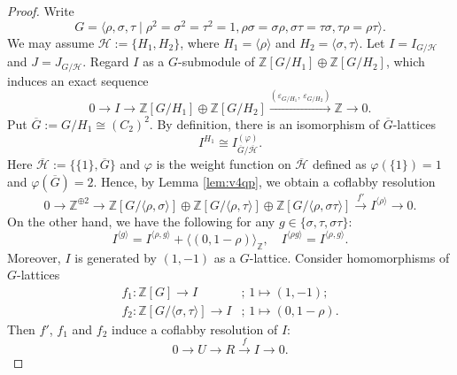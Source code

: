 \documentclass[12pt]{amsart}
\theoremstyle{plain}
\theoremstyle{definition}
\numberwithin{thm}{section}
\numberwithin{equation}{section}
\newcommand{\Z}{\mathbb{Z}}
\newcommand{\cH}{\mathcal{H}}
\begin{document}
\begin{proof}
Write
\begin{equation*}
  G=\langle \rho,\sigma,\tau \mid \rho^{2}=\sigma^{2}=\tau^{2}=1,\rho \sigma=\sigma\rho,\sigma \tau=\tau\sigma, \tau \rho=\rho\tau \rangle.  
\end{equation*}
We may assume $\cH:=\{H_{1},H_{2}\}$, where $H_{1}=\langle \rho \rangle$ and $H_{2}=\langle \sigma,\tau \rangle$. Let $I=I_{G/\cH}$ and $J=J_{G/\cH}$. Regard $I$ as a $G$-submodule of $\Z[G/H_{1}]\oplus \Z[G/H_{2}]$, which induces an exact sequence
\begin{equation}\label{eq:2mvr}
    0\rightarrow I \rightarrow \Z[G/H_{1}]\oplus \Z[G/H_{2}] \xrightarrow{(\varepsilon_{G/H_{1}},\,\varepsilon_{G/H_{2}})} \Z \rightarrow 0. 
\end{equation}
Put $\overline{G}:=G/H_{1} \cong (C_{2})^{2}$. By definition, there is an isomorphism of $\overline{G}$-lattices
\begin{equation*}
    I^{H_{1}}\cong I_{\overline{G}/\overline{\cH}}^{(\varphi)}.
\end{equation*}
Here $\overline{\cH}:=\{\{1\},\overline{G}\}$ and $\varphi$ is the weight function on $\overline{\cH}$ defined as $\varphi(\{1\})=1$ and $\varphi(\overline{G})=2$. Hence, by Lemma \ref{lem:v4qp}, we obtain a coflabby resolution
\begin{equation*}
    0\rightarrow \Z^{\oplus 2}\rightarrow \Z[G/\langle \rho, \sigma \rangle]\oplus \Z[G/\langle \rho,\tau \rangle]\oplus \Z[G/\langle \rho,\sigma \tau \rangle] \xrightarrow{f'} I^{\langle \rho \rangle}\rightarrow 0. 
\end{equation*}
On the other hand, we have the following for any $g\in \{\sigma,\tau,\sigma\tau \}$: 
\begin{equation*}
    I^{\langle g\rangle}=I^{\langle \rho,g\rangle}+\langle (0,1-\rho) \rangle_{\Z},\quad
    I^{\langle \rho g\rangle}=I^{\langle \rho,g\rangle}. 
\end{equation*}
Moreover, $I$ is generated by $(1,-1)$ as a $G$-lattice. Consider homomorphisms of $G$-lattices
\begin{align*}
f_{1}\colon \Z[G]\rightarrow I&;\,1\mapsto (1,-1);\\
f_{2}\colon \Z[G/\langle \sigma, \tau \rangle]\rightarrow I&;\,1\mapsto  (0,1-\rho). 
\end{align*}
Then $f'$, $f_{1}$ and $f_{2}$ induce a coflabby resolution of $I$: 
\begin{equation*}
0\rightarrow U \rightarrow R \xrightarrow{f} I \rightarrow 0. 
\end{equation*}


\end{proof}
\end{document}
